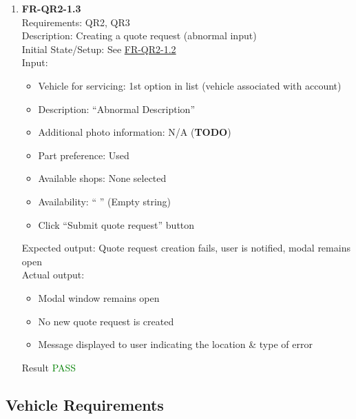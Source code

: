 \documentclass[12pt, titlepage]{article}
\newcommand{\testpass}{\textcolor{green}{PASS}}
\begin{document}
\begin{enumerate}
                \item \textbf{FR-QR2-1.3} \label{FR-QR2-1.3} \\ Requirements: QR2, QR3  \\
                    Description: Creating a quote request (abnormal input) \\
                    Initial State/Setup: See \hyperref[FR-QR2-1.2]{FR-QR2-1.2} \\
                    Input: \begin{itemize}
                        \item Vehicle for servicing: 1st option in list (vehicle associated with account)
                        \item Description: ``Abnormal Description''
                        \item Additional photo information: N/A (\textbf{TODO})
                        \item Part preference: Used
                        \item Available shops: None selected
                        \item Availability: `` '' (Empty string)
                        \item Click ``Submit quote request'' button
                    \end{itemize}
                    Expected output: Quote request creation fails, user is notified, modal remains open \\
                    Actual output: \begin{itemize}
                        \item Modal window remains open
                        \item No new quote request is created
                        \item Message displayed to user indicating the location \& type of error
                    \end{itemize}
                    Result \testpass
            \end{enumerate}
    

    \subsection{Vehicle Requirements}
\end{document}

